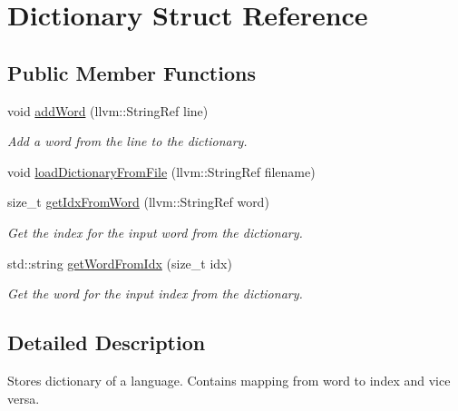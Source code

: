 \hypertarget{struct_dictionary}{}\section{Dictionary Struct Reference}
\label{struct_dictionary}
\subsection*{Public Member Functions}
\begin{DoxyCompactItemize}
\item 
\mbox{\label{struct_dictionary_a338673cd928e014f8f2a2cde452c00fd}} 
void \hyperlink{struct_dictionary_a338673cd928e014f8f2a2cde452c00fd}{add\+Word} (llvm\+::\+String\+Ref line)
\begin{DoxyCompactList}\small\item\em Add a word from the {\ttfamily line} to the dictionary. \end{DoxyCompactList}\item 
void \hyperlink{struct_dictionary_ab13706e0db58647f40c38bf4c56cd213}{load\+Dictionary\+From\+File} (llvm\+::\+String\+Ref filename)
\item 
\mbox{\label{struct_dictionary_a9e81cedc3ed92cc682c98605f75652cd}} 
size\+\_\+t \hyperlink{struct_dictionary_a9e81cedc3ed92cc682c98605f75652cd}{get\+Idx\+From\+Word} (llvm\+::\+String\+Ref word)
\begin{DoxyCompactList}\small\item\em Get the index for the input {\ttfamily word} from the dictionary. \end{DoxyCompactList}\item 
\mbox{\label{struct_dictionary_a19f9ad7cd0bafb9898b62a7cb9eabeb3}} 
std\+::string \hyperlink{struct_dictionary_a19f9ad7cd0bafb9898b62a7cb9eabeb3}{get\+Word\+From\+Idx} (size\+\_\+t idx)
\begin{DoxyCompactList}\small\item\em Get the word for the input {\ttfamily index} from the dictionary. \end{DoxyCompactList}\end{DoxyCompactItemize}


\subsection{Detailed Description}
Stores dictionary of a language. Contains mapping from word to index and vice versa. 

